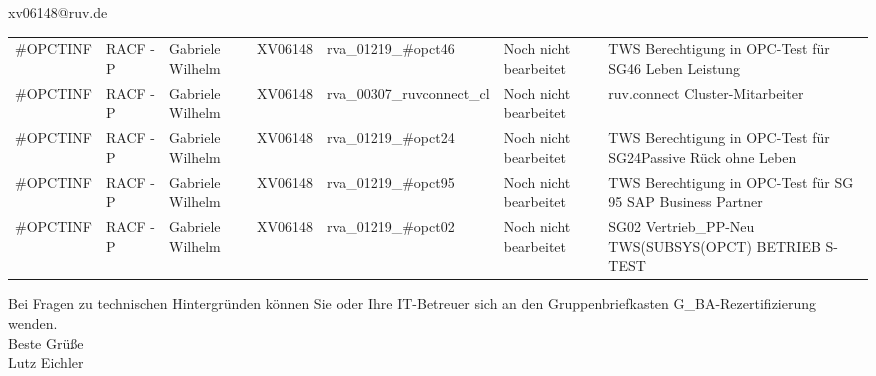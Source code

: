 \documentclass[a4paper,landscape,12pt]{letter}
\begin{document}
\begin{letter}{xv06148@ruv.de\hfill \break}
\begin{tiny}
\begin{longtable}{|p{35mm}|p{15mm}|p{25mm}|p{10mm}|p{40mm}|p{50mm}|p{50mm}|}
\#OPCTINF & RACF - P & Gabriele Wilhelm & XV06148 & rva\_01219\_\#opct46 & Noch nicht bearbeitet & TWS Berechtigung in OPC-Test für SG46 Leben Leistung \\
\#OPCTINF & RACF - P & Gabriele Wilhelm & XV06148 & rva\_00307\_ruvconnect\_cl & Noch nicht bearbeitet & ruv.connect Cluster-Mitarbeiter \\
\#OPCTINF & RACF - P & Gabriele Wilhelm & XV06148 & rva\_01219\_\#opct24 & Noch nicht bearbeitet & TWS Berechtigung in OPC-Test für SG24Passive Rück ohne Leben \\
\#OPCTINF & RACF - P & Gabriele Wilhelm & XV06148 & rva\_01219\_\#opct95 & Noch nicht bearbeitet &  TWS Berechtigung in OPC-Test für SG 95 SAP Business Partner \\
\#OPCTINF & RACF - P & Gabriele Wilhelm & XV06148 & rva\_01219\_\#opct02 & Noch nicht bearbeitet & SG02 Vertrieb\_PP-Neu TWS(SUBSYS(OPCT) BETRIEB S-TEST \\

\hline
		\end{longtable}
		\end{tiny}
	
\begin{minipage}{\textwidth}
			Bei Fragen zu technischen Hintergründen können Sie 
			oder Ihre IT-Betreuer sich an den Gruppenbriefkasten 
			G\_BA-Rezertifizierung
			wenden.\\
			\linebreak
			Beste Grüße\\
			Lutz Eichler
	\end{minipage}
	\end{letter}
	
\end{document}
